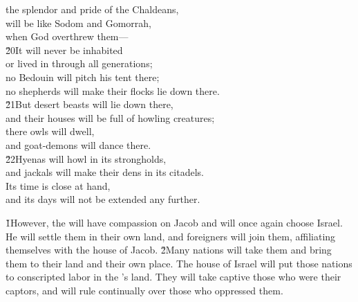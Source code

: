 \begin{poetry}
\poemll    the splendor and pride of the Chaldeans, \\
\poeml will be like Sodom and Gomorrah, \\
\poemll    when God overthrew them--- \\
\poeml \v{20}It will never be inhabited \\
\poemll    or lived in through all generations; \\
\poeml no Bedouin will pitch his tent there; \\
\poemll    no shepherds will make their flocks lie down there. \\
\poeml \v{21}But desert beasts will lie down there, \\
\poemll    and their houses will be full of howling creatures; \\
\poeml there owls will dwell, \\
\poemll    and goat-demons will dance there. \\
\poeml \v{22}Hyenas will howl in its strongholds, \\
\poemll    and jackals will make their dens in its citadels. \\
\poeml Its time is close at hand, \\
\poemll    and its days will not be extended any further.
\end{poetry}

\v{1}However, the  will have compassion on Jacob and will once again choose Israel. He will settle them in their own land, and foreigners will join them, affiliating themselves with the house of Jacob. \v{2}Many nations will take them and bring them to their land and their own place. The house of Israel will put those nations to conscripted labor in the 's land. They will take captive those who were their captors, and will rule continually over those who oppressed them.

